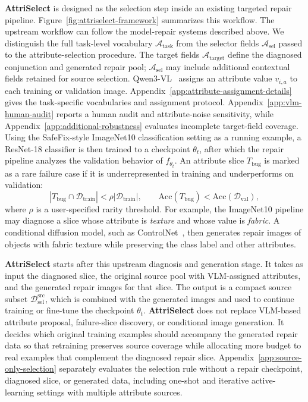\documentclass[10pt,twocolumn,letterpaper]{article}
\newcommand{\modelname}{AttriSelect}
\newcommand{\model}{\textcolor{darkteal}{\textbf{\modelname}}\xspace}
\newcommand{\dataset}{\mathcal{D}}
\newcommand{\attrs}{\mathcal{A}_{\mathrm{task}}}
\newcommand{\selattrs}{\mathcal{A}_{\mathrm{sel}}}
\newcommand{\targetattrs}{\mathcal{A}_{\mathrm{target}}}
\begin{document}
\model is designed as the selection step inside an existing targeted repair pipeline. Figure~\ref{fig:attriselect-framework} summarizes this workflow. The upstream workflow can follow the model-repair systems described above. We distinguish the full task-level vocabulary $\attrs$ from the selector fields $\selattrs$ passed to the attribute-selection procedure. The target fields $\targetattrs$ define the diagnosed conjunction and generated repair pool; $\selattrs$ may include additional contextual fields retained for source selection. Qwen3-VL~\citep{bai2025qwen3vl} assigns an attribute value $v_{i,a}$ to each training or validation image. Appendix~\ref{app:attribute-assignment-details} gives the task-specific vocabularies and assignment protocol. Appendix~\ref{app:vlm-human-audit} reports a human audit and attribute-noise sensitivity, while Appendix~\ref{app:additional-robustness} evaluates incomplete target-field coverage. Using the SafeFix-style ImageNet10 classification setting as a running example, a ResNet-18 classifier is then trained to a checkpoint $\theta_t$, after which the repair pipeline analyzes the validation behavior of $f_{\theta_t}$. An attribute slice $T_{\mathrm{bug}}$ is marked as a rare failure case if it is underrepresented in training and underperforms on validation:
\begin{equation}
\label{eq:rare-failure-slice}
|T_{\mathrm{bug}}\cap\dataset_{\mathrm{train}}| < \rho |\dataset_{\mathrm{train}}|,
\qquad
\mathrm{Acc}(T_{\mathrm{bug}}) < \mathrm{Acc}(\dataset_{\mathrm{val}}),
\end{equation}
where $\rho$ is a user-specified rarity threshold. For example, the ImageNet10 pipeline may diagnose a slice whose attribute is \emph{texture} and whose value is \emph{fabric}. A conditional diffusion model, such as ControlNet~\citep{zhang2023adding}, then generates repair images of objects with fabric texture while preserving the class label and other attributes.

\model starts after this upstream diagnosis and generation stage. It takes as input the diagnosed slice, the original source pool with VLM-assigned attributes, and the generated repair images for that slice. The output is a compact source subset $\dataset_{\mathrm{sel}}^{\mathrm{src}}$, which is combined with the generated images and used to continue training or fine-tune the checkpoint $\theta_t$. \model does not replace VLM-based attribute proposal, failure-slice discovery, or conditional image generation. It decides which original training examples should accompany the generated repair data so that retraining preserves source coverage while allocating more budget to real examples that complement the diagnosed repair slice. Appendix~\ref{app:source-only-selection} separately evaluates the selection rule without a repair checkpoint, diagnosed slice, or generated data, including one-shot and iterative active-learning settings with multiple attribute sources.
\end{document}
